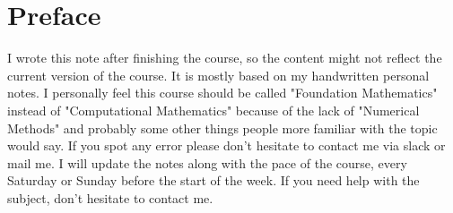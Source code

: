 \chapter{Preface}
I wrote this note after finishing the course, so the content might not reflect the current version of the course. It is mostly based on my handwritten personal notes. I personally feel this course should be called "Foundation Mathematics" instead of "Computational Mathematics" because of the lack of "Numerical Methods" and probably some other things people more familiar with the topic would say. If you spot any error please don't hesitate to contact me via slack or mail me. I will update the notes along with the pace of the course, every Saturday or Sunday before the start of the week. If you need help with the subject, don't hesitate to contact me.